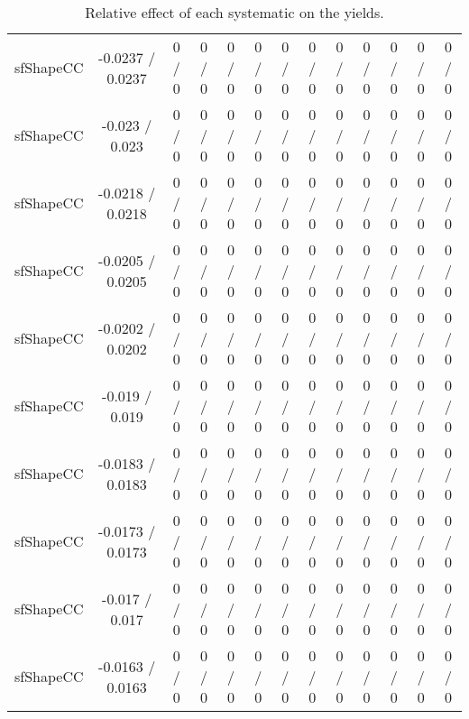 \documentclass[10pt]{article}
\begin{document}
\begin{table}[htbp]
\begin{center}
\begin{tabular}{|c|c|c|c|c|c|c|c|c|c|c|c|c|}
  sfShapeCC & -0.0237 / 0.0237 & 0 / 0 & 0 / 0 & 0 / 0 & 0 / 0 & 0 / 0 & 0 / 0 & 0 / 0 & 0 / 0 & 0 / 0 & 0 / 0 & 0 / 0 \\ 
  sfShapeCC & -0.023 / 0.023 & 0 / 0 & 0 / 0 & 0 / 0 & 0 / 0 & 0 / 0 & 0 / 0 & 0 / 0 & 0 / 0 & 0 / 0 & 0 / 0 & 0 / 0 \\ 
  sfShapeCC & -0.0218 / 0.0218 & 0 / 0 & 0 / 0 & 0 / 0 & 0 / 0 & 0 / 0 & 0 / 0 & 0 / 0 & 0 / 0 & 0 / 0 & 0 / 0 & 0 / 0 \\ 
  sfShapeCC & -0.0205 / 0.0205 & 0 / 0 & 0 / 0 & 0 / 0 & 0 / 0 & 0 / 0 & 0 / 0 & 0 / 0 & 0 / 0 & 0 / 0 & 0 / 0 & 0 / 0 \\ 
  sfShapeCC & -0.0202 / 0.0202 & 0 / 0 & 0 / 0 & 0 / 0 & 0 / 0 & 0 / 0 & 0 / 0 & 0 / 0 & 0 / 0 & 0 / 0 & 0 / 0 & 0 / 0 \\ 
  sfShapeCC & -0.019 / 0.019 & 0 / 0 & 0 / 0 & 0 / 0 & 0 / 0 & 0 / 0 & 0 / 0 & 0 / 0 & 0 / 0 & 0 / 0 & 0 / 0 & 0 / 0 \\ 
  sfShapeCC & -0.0183 / 0.0183 & 0 / 0 & 0 / 0 & 0 / 0 & 0 / 0 & 0 / 0 & 0 / 0 & 0 / 0 & 0 / 0 & 0 / 0 & 0 / 0 & 0 / 0 \\ 
  sfShapeCC & -0.0173 / 0.0173 & 0 / 0 & 0 / 0 & 0 / 0 & 0 / 0 & 0 / 0 & 0 / 0 & 0 / 0 & 0 / 0 & 0 / 0 & 0 / 0 & 0 / 0 \\ 
  sfShapeCC & -0.017 / 0.017 & 0 / 0 & 0 / 0 & 0 / 0 & 0 / 0 & 0 / 0 & 0 / 0 & 0 / 0 & 0 / 0 & 0 / 0 & 0 / 0 & 0 / 0 \\ 
  sfShapeCC & -0.0163 / 0.0163 & 0 / 0 & 0 / 0 & 0 / 0 & 0 / 0 & 0 / 0 & 0 / 0 & 0 / 0 & 0 / 0 & 0 / 0 & 0 / 0 & 0 / 0 \\ 
\hline 
\end{tabular} 
\caption{Relative effect of each systematic on the yields.} 
\end{center} 
\end{table} 
\end{document}
